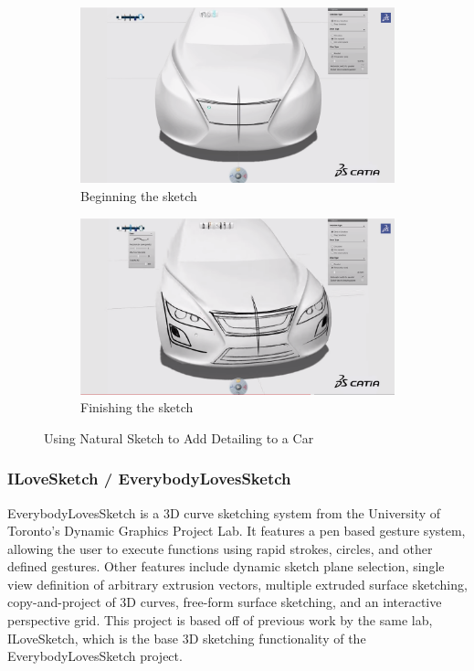 \documentclass[12pt]{article}
\begin{document}
\begin{figure}

\begin{subfigure}{\textwidth}
\includegraphics[width=\textwidth]{CATIA1}
\caption{Beginning the sketch}
\end{subfigure}
\begin{subfigure}{\textwidth}
\includegraphics[width=\textwidth]{CATIA2}
\caption{Finishing the sketch}
\end{subfigure}

\caption{Using Natural Sketch to Add Detailing to a Car}
\end{figure}


\subsubsection{ILoveSketch / EverybodyLovesSketch}

EverybodyLovesSketch is a 3D curve sketching system from the University of Toronto's Dynamic Graphics Project Lab. It features a pen based gesture system, allowing the user to execute functions using rapid strokes, circles, and other defined gestures. Other features include dynamic sketch plane selection, single view definition of arbitrary extrusion vectors, multiple extruded surface sketching, copy-and-project of 3D curves, free-form surface sketching, and an interactive perspective grid. This project is based off of previous work by the same lab, ILoveSketch, which is the base 3D sketching functionality of the EverybodyLovesSketch project.
\end{document}
